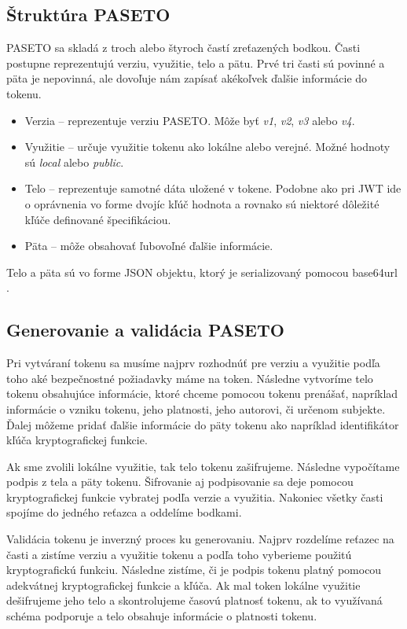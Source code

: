 \subsection{Štruktúra PASETO}

PASETO sa skladá z troch alebo štyroch častí zreťazených bodkou. Časti postupne reprezentujú verziu, využitie, telo a pätu. Prvé tri časti sú povinné a päta je nepovinná, ale dovoľuje nám zapísať akékoľvek ďalšie informácie do tokenu.

\begin{itemize}
    \item Verzia -- reprezentuje verziu PASETO. Môže byť \textit{v1}, \textit{v2}, \textit{v3} alebo \textit{v4}.
    \item Využitie -- určuje využitie tokenu ako lokálne alebo verejné. Možné hodnoty sú \textit{local} alebo \textit{public}.
    \item Telo -- reprezentuje samotné dáta uložené v tokene. Podobne ako pri JWT ide o oprávnenia vo forme dvojíc kľúč hodnota a rovnako sú niektoré dôležité kľúče definované špecifikáciou. \cite{paseto_git}
    \item Päta -- môže obsahovať ľubovoľné ďalšie informácie.
\end{itemize}

Telo a päta sú vo forme JSON objektu, ktorý je serializovaný pomocou base64url \cite{base64_rfc}.


\subsection{Generovanie a validácia PASETO}

Pri vytváraní tokenu sa musíme najprv rozhodnúť pre verziu a využitie podľa toho aké bezpečnostné požiadavky máme na token. Následne vytvoríme telo tokenu obsahujúce informácie, ktoré chceme pomocou tokenu prenášať, napríklad informácie o vzniku tokenu, jeho platnosti, jeho autorovi, či určenom subjekte. Ďalej môžeme pridať ďalšie informácie do päty tokenu ako napríklad identifikátor kľúča kryptografickej funkcie. 

Ak sme zvolili lokálne využitie, tak telo tokenu zašifrujeme. Následne vypočítame podpis z tela a päty tokenu. Šifrovanie aj podpisovanie sa deje pomocou kryptografickej funkcie vybratej podľa verzie a využitia. Nakoniec všetky časti spojíme do jedného reťazca a oddelíme bodkami.

Validácia tokenu je inverzný proces ku generovaniu. Najprv rozdelíme reťazec na časti a zistíme verziu a využitie tokenu a podľa toho vyberieme použitú kryptografickú funkciu. Následne zistíme, či je podpis tokenu platný pomocou adekvátnej kryptografickej funkcie a kľúča. Ak mal token lokálne využitie dešifrujeme jeho telo a skontrolujeme časovú platnosť tokenu, ak to využívaná schéma podporuje a telo obsahuje informácie o platnosti tokenu.

